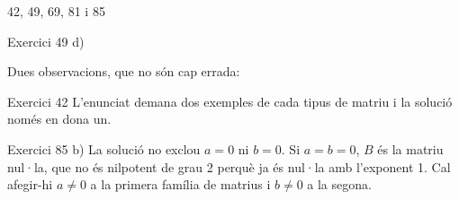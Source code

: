 
%
        {42, 49, 69, 81 i 85}

\begin{errada}{Exercici 49 d)}
\end{errada}


\ifobs
\bigskip
\noindent
Dues observacions, que no són cap errada:\par\nopagebreak

\begin{observacio}{Exercici 42}
  L'enunciat demana dos exemples de cada tipus de matriu i la solució només
  en dona un.
\end{observacio}

\begin{observacio}{Exercici 85 b)}
  La solució no exclou $a=0$ ni $b=0$. Si $a=b=0$, $B$ és la matriu nul·la, que no és nilpotent de grau 2 perquè ja és nul·la amb l'exponent 1. Cal afegir-hi $a\neq 0$ a la primera família de matrius i $b\neq 0$ a la segona.
\end{observacio}
\fi
